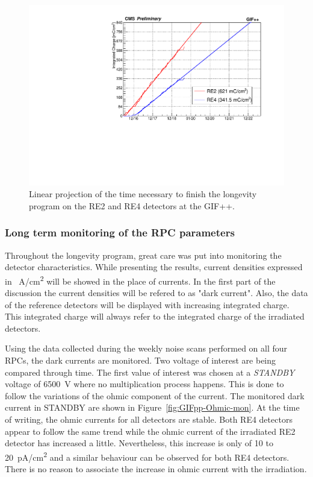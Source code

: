 \endgroup
	
	\begin{figure}[H]
        \centering
		\includegraphics[width = 0.7\linewidth]{fig/chapt5/Qint-vs-Time-Extrapolation.pdf}
		\caption{\label{fig:GIFppQint-Extrapol} Linear projection of the time necessary to finish the longevity program on the RE2 and RE4 detectors at the GIF++.}
	\end{figure}
	
		\subsubsection{Long term monitoring of the RPC parameters}
		\label{chapt5:sssec:longterm}
	
	Throughout the longevity program, great care was put into monitoring the detector characteristics. While presenting the results, current densities expressed in \si{\mu A/cm^2} will be showed in the place of currents. In the first part of the discussion the current densities will be refered to as "dark current". Also, the data of the reference detectors will be displayed with increasing integrated charge. This integrated charge will always refer to the integrated charge of the irradiated detectors.
	
	Using the data collected during the weekly noise scans performed on all four RPCs, the dark currents are monitored. Two voltage of interest are being compared through time. The first value of interest was chosen at a \textit{STANDBY} voltage of \SI{6500}{V} where no multiplication process happens. This is done to follow the variations of the ohmic component of the current. The monitored dark current in STANDBY are shown in Figure~\ref{fig:GIFpp-Ohmic-mon}. At the time of writing, the ohmic currents for all detectors are stable. Both RE4 detectors appear to follow the same trend while the ohmic current of the irradiated RE2 detector has increased a little. Nevertheless, this increase is only of 10 to \SI{20}{pA/cm^2} and a similar behaviour can be observed for both RE4 detectors. There is no reason to associate the increase in ohmic current with the irradiation.

